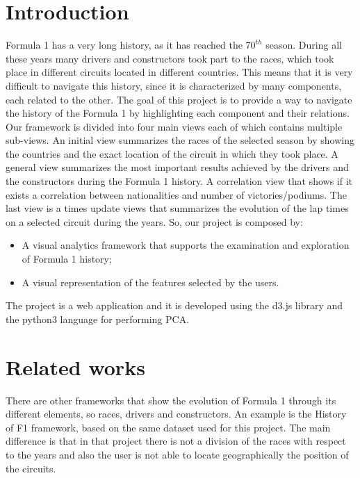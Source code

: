 \documentclass[11pt,twocolumn,letterpaper]{article}
\begin{document}
\section{Introduction}
Formula 1 has a very long history, as it has reached the $70^{th}$ season. During all these years many drivers and constructors took part to the races, which took
place in different circuits located in different countries. This means that it is very difficult to navigate this history, since it is characterized by many components,
each related to the other. The goal of this project is to provide a way to navigate the history of the Formula 1 by highlighting each component and their relations.
Our framework is divided into four main views each of which contains multiple sub-views. An initial view summarizes the races of the selected season by showing
the countries and the exact location of the circuit in which they took place. A general view summarizes the most important results achieved by the drivers and the
constructors during the Formula 1 history. A correlation view that shows if it exists a correlation between nationalities and number of victories/podiums. The last
view is a times update views that summarizes the evolution of the lap times on a selected circuit during the years. So, our project is composed by:
\begin{itemize}
	\item A visual analytics framework that supports the examination and exploration of Formula 1 history;
	\item A visual representation of the features selected by the users.
\end{itemize}
The project is a web application and it is developed using the d3.js \cite{D3} library and the python3 language for performing PCA.

\section{Related works}
There are other frameworks that show the evolution of Formula 1 through its different elements, so races, drivers and constructors. An example is the History of F1
\cite{HistoryOfF1} framework, based on the same dataset used for this project. The main difference is that in that project
there is not a division of the races with respect to the years and also the user is not able to locate geographically the position of the circuits. 
\end{document}
